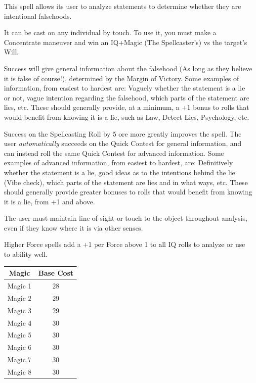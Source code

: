 \begin{multicols}{3}
	This spell allows its user to analyze statements to determine whether they are intentional falsehoods.
	
	It can be cast on any individual by touch. To use it, you must make a Concentrate maneuver and win an IQ+Magic (The Spellcaster's) vs the target's Will. 
	
	Success will give general information about the falsehood (As long as they believe it is false of course!), determined by the Margin of Victory. Some examples of information, from easiest to hardest are: Vaguely whether the statement is a lie or not, vague intention regarding the falsehood, which parts of the statement are lies, etc. These should generally provide, at a minimum, a +1 bonus to rolls that would benefit from knowing it is a lie, such as Law, Detect Lies, Psychology, etc.
	
	Success on the Spellcasting Roll by 5 ore more greatly improves the spell. The user \textit{automatically} succeeds on the Quick Contest for general information, and can instead roll the same Quick Contest for advanced information. Some examples of advanced information, from easiest to hardest, are: Definitively whether the statement is a lie, good ideas as to the intentions behind the lie (Vibe check), which parts of the statement are lies and in what ways, etc. These should generally provide greater bonuses to rolls that would benefit from knowing it is a lie, from +1 and above.
	
	The user must maintain line of sight or touch to the object throughout analysis, even if they know where it is via other senses.
	
	Higher Force spells add a +1 per Force above 1 to all IQ rolls to analyze or use to ability well.
	
	\begin{center}
		\begin{tabular}{|c|c|}
			\hline
			Magic & Base Cost \\
			\hline
			\hline
			Magic 1 & 28 \\
			Magic 2 & 29 \\
			Magic 3 & 29 \\
			Magic 4 & 30 \\
			Magic 5 & 30 \\
			Magic 6 & 30 \\
			Magic 7 & 30 \\
			Magic 8 & 30 \\
			\hline
		\end{tabular}
	\end{center}
	

\end{multicols}
